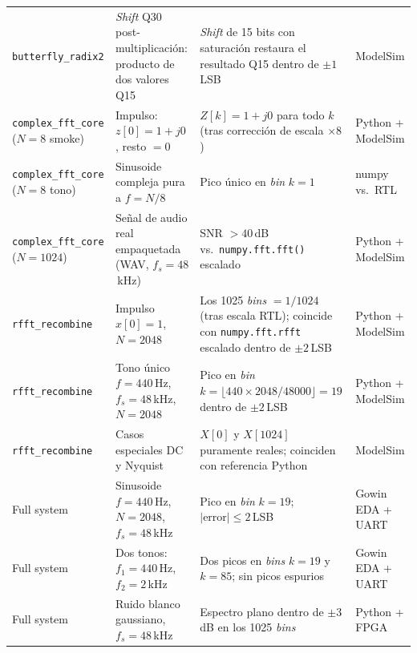 \documentclass[11pt,a4paper]{article}
\begin{document}
\begin{longtable}{@{}p{3.2cm} p{4.6cm} p{4.6cm} p{2.0cm}@{}}
\texttt{butterfly\_radix2} & \emph{Shift} Q30 post-multiplicación: producto de dos valores Q15 & \emph{Shift} de 15 bits con saturación restaura el resultado Q15 dentro de $\pm1$\,LSB & ModelSim \\
\texttt{complex\_fft\_core} ($N=8$ smoke) & Impulso: $z[0]=1+j0$, resto $=0$ & $Z[k]=1+j0$ para todo $k$ (tras corrección de escala $\times8$) & Python + ModelSim \\
\texttt{complex\_fft\_core} ($N=8$ tono) & Sinusoide compleja pura a $f=N/8$ & Pico único en \emph{bin} $k=1$ & numpy vs.\ RTL \\
\texttt{complex\_fft\_core} ($N=1024$) & Señal de audio real empaquetada (WAV, $f_s=48$\,kHz) & SNR $>40$\,dB vs.\ \texttt{numpy.fft.fft()} escalado & Python + ModelSim \\
\texttt{rfft\_recombine} & Impulso $x[0]=1$, $N=2048$ & Los 1025 \emph{bins} $=1/1024$ (tras escala RTL); coincide con \texttt{numpy.fft.rfft} escalado dentro de $\pm2$\,LSB & Python + ModelSim \\
\texttt{rfft\_recombine} & Tono único $f=440$\,Hz, $f_s=48$\,kHz, $N=2048$ & Pico en \emph{bin} $k = \lfloor 440\times 2048/48000\rfloor = 19$ dentro de $\pm2$\,LSB & Python + ModelSim \\
\texttt{rfft\_recombine} & Casos especiales DC y Nyquist & $X[0]$ y $X[1024]$ puramente reales; coinciden con referencia Python & ModelSim \\
Full system & Sinusoide $f=440$\,Hz, $N=2048$, $f_s=48$\,kHz & Pico en \emph{bin} $k=19$; $|\text{error}|\leq 2$\,LSB & Gowin EDA + UART \\
Full system & Dos tonos: $f_1=440$\,Hz, $f_2=2$\,kHz & Dos picos en \emph{bins} $k=19$ y $k=85$; sin picos espurios & Gowin EDA + UART \\
Full system & Ruido blanco gaussiano, $f_s=48$\,kHz & Espectro plano dentro de $\pm3$\,dB en los 1025 \emph{bins} & Python + FPGA \\
\end{longtable}
\end{document}
